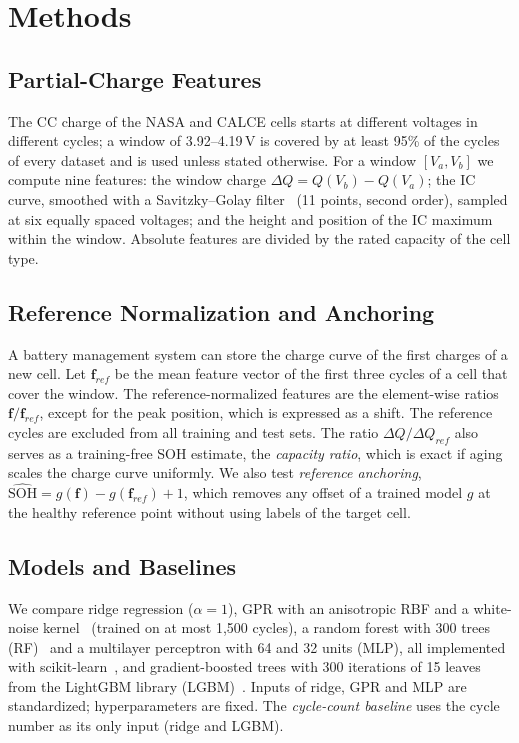 \documentclass[conference]{IEEEtran}
\begin{document}
\section{Methods}
\subsection{Partial-Charge Features}
The CC charge of the NASA and CALCE cells starts at different voltages in different cycles; a window of 3.92--4.19\,V is covered by at least 95\% of the cycles of every dataset and is used unless stated otherwise. For a window $[V_a,V_b]$ we compute nine features: the window charge $\Delta Q=Q(V_b)-Q(V_a)$; the IC curve, smoothed with a Savitzky--Golay filter~\cite{savitzky1964} (11 points, second order), sampled at six equally spaced voltages; and the height and position of the IC maximum within the window. Absolute features are divided by the rated capacity of the cell type.

\subsection{Reference Normalization and Anchoring}
A battery management system can store the charge curve of the first charges of a new cell. Let $\mathbf{f}_{ref}$ be the mean feature vector of the first three cycles of a cell that cover the window. The reference-normalized features are the element-wise ratios $\mathbf{f}/\mathbf{f}_{ref}$, except for the peak position, which is expressed as a shift. The reference cycles are excluded from all training and test sets. The ratio $\Delta Q/\Delta Q_{ref}$ also serves as a training-free SOH estimate, the \emph{capacity ratio}, which is exact if aging scales the charge curve uniformly. We also test \emph{reference anchoring}, $\widehat{\mathrm{SOH}}=g(\mathbf{f})-g(\mathbf{f}_{ref})+1$, which removes any offset of a trained model $g$ at the healthy reference point without using labels of the target cell.

\subsection{Models and Baselines}
We compare ridge regression ($\alpha=1$), GPR with an anisotropic RBF and a white-noise kernel~\cite{rasmussen2006gp} (trained on at most 1{,}500 cycles), a random forest with 300 trees (RF)~\cite{breiman2001rf} and a multilayer perceptron with 64 and 32 units (MLP), all implemented with scikit-learn~\cite{pedregosa2011sklearn}, and gradient-boosted trees with 300 iterations of 15 leaves from the LightGBM library (LGBM)~\cite{ke2017lightgbm}. Inputs of ridge, GPR and MLP are standardized; hyperparameters are fixed. The \emph{cycle-count baseline} uses the cycle number as its only input (ridge and LGBM).
\end{document}
